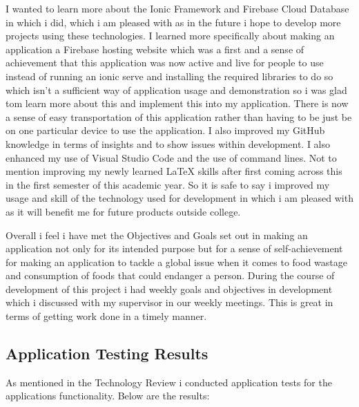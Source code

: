 I wanted to learn more about the Ionic Framework and Firebase Cloud Database in which i did, which i am pleased with as in the future i hope to develop more projects using these technologies. I learned more specifically about making an application a Firebase hosting website which was a first and a sense of achievement that this application was now active and live for people to use instead of running an ionic serve and installing the required libraries to do so which isn't a sufficient way of application usage and demonstration so i was glad tom learn more about this and implement this into my application. There is now a sense of easy transportation of this application rather than having to be just be on one particular device to use the application. I also improved my GitHub knowledge in terms of insights and to show issues within development. I also enhanced my use of Visual Studio Code and the use of command lines. Not to mention improving my newly learned LaTeX skills after first coming across this in the first semester of this academic year. So it is safe to say i improved my usage and skill of the technology used for development in which i am pleased with as it will benefit me for future products outside college. 
\newline

Overall i feel i have met the Objectives and Goals set out in making an application not only for its intended purpose but for a sense of self-achievement for making an application to tackle a global issue when it comes to food wastage and consumption of foods that could endanger a person. During the course of development of this project i had weekly goals and objectives in development which i discussed with my supervisor in our weekly meetings. This is great in terms of getting work done in a timely manner.

\subsection{Application Testing Results}
As mentioned in the Technology Review i conducted application tests for the applications functionality. Below are the results:

